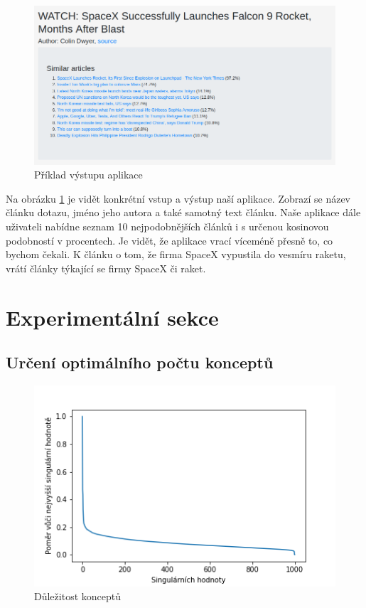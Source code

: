 \documentclass[11pt]{scrartcl} %
\begin{document}
\begin{figure}[h] %
	\centering
	\includegraphics[width=0.8\columnwidth]{images/output.png}
	\caption{Příklad výstupu aplikace}
	\label{output}
\end{figure}

Na obrázku \ref{output} je vidět konkrétní vstup a výstup naší aplikace. Zobrazí se název článku dotazu, jméno jeho autora a také samotný text článku. Naše aplikace dále uživateli nabídne seznam 10 nejpodobnějších článků i s určenou kosinovou podobností v procentech. Je vidět, že aplikace vrací víceméně přesně to, co bychom čekali. K článku o tom, že firma SpaceX vypustila do vesmíru raketu, vrátí články týkající se firmy SpaceX či raket.

\section{Experimentální sekce}

\subsection{Určení optimálního počtu konceptů}

\begin{figure}[h] %
	\centering
	\includegraphics[width=0.7\columnwidth]{images/singular_values.png}
	\caption{Důležitost konceptů}
	\label{concepts}
\end{figure}
\end{document}
